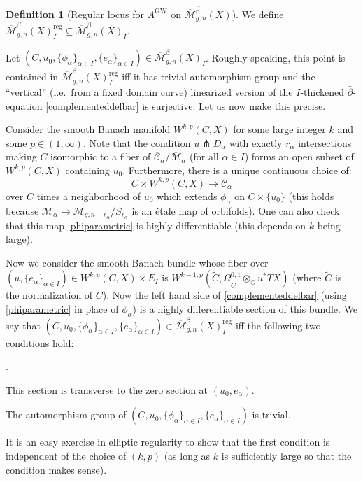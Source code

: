 \documentclass[12pt]{article}
\theoremstyle{definition}
\newtheorem{definition}[theorem]{Definition}
\theoremstyle{remark}
\numberwithin{equation}{subsection}
\newcommand{\CC}{\mathbb C}
\newcommand{\Mbar}{\overline{\mathcal M}}
\newcommand{\Cbar}{\overline{\mathcal C}}
\newcommand{\delbar}{\bar\partial}
\newcommand{\GW}{\mathrm{GW}}
\newcommand{\reg}{\mathrm{reg}}
\newcounter{rcounti}
\newenvironment{rlist}{\begin{list}{\roman{rcounti}.}{\usecounter{rcounti}
\setlength\itemsep{0pt}
\setlength\labelsep{4pt}
\setlength\labelwidth{16pt}
\setlength\leftmargin{32pt}
\setlength\listparindent{0pt}
\setlength\parsep{0pt}
\setlength\parskip{0pt}
\setlength\partopsep{0pt}
\setlength\rightmargin{0pt}
\setlength\topsep{0pt}
\setlength\itemindent{0pt}
}}{\end{list}}
\begin{document}
\begin{definition}[Regular locus for $A^\GW$ on $\Mbar_{g,n}^\beta(X)$]\label{regularsubsetdefinition}
We define $\Mbar_{g,n}^\beta(X)_I^\reg\subseteq\Mbar_{g,n}^\beta(X)_I$.

Let $(C,u_0,\{\phi_\alpha\}_{\alpha\in I},\{e_\alpha\}_{\alpha\in I})\in\Mbar_{g,n}^\beta(X)_I$.  Roughly speaking, this point is contained in $\Mbar_{g,n}^\beta(X)_I^\reg$ iff it has trivial automorphism group and the ``vertical'' (i.e.\ from a fixed domain curve) linearized version of the $I$-thickened $\delbar$-equation \eqref{complementeddelbar} is surjective.  Let us now make this precise.

Consider the smooth Banach manifold $W^{k,p}(C,X)$ for some large integer $k$ and some $p\in(1,\infty)$.  Note that the condition $u\pitchfork D_\alpha$ with exactly $r_\alpha$ intersections making $C$ isomorphic to a fiber of $\Cbar_\alpha/\Mbar_\alpha$ (for all $\alpha\in I$) forms an open subset of $W^{k,p}(C,X)$ containing $u_0$.  Furthermore, there is a unique continuous choice of:
\begin{equation}\label{phiparametric}
C\times W^{k,p}(C,X)\to\Cbar_\alpha
\end{equation}
over $C$ times a neighborhood of $u_0$ which extends $\phi_\alpha$ on $C\times\{u_0\}$ (this holds because $\Mbar_\alpha\to\Mbar_{g,n+r_\alpha}/S_{r_\alpha}$ is an \'etale map of orbifolds).  One can also check that this map \eqref{phiparametric} is highly differentiable (this depends on $k$ being large).

Now we consider the smooth Banach bundle whose fiber over $(u,\{e_\alpha\}_{\alpha\in I})\in W^{k,p}(C,X)\times E_I$ is $W^{k-1,p}(\tilde C,\Omega^{0,1}_{\tilde C}\otimes_\CC u^\ast TX)$ (where $\tilde C$ is the normalization of $C$).  Now the left hand side of \eqref{complementeddelbar} (using \eqref{phiparametric} in place of $\phi_\alpha$) is a highly differentiable section of this bundle.  We say that $(C,u_0,\{\phi_\alpha\}_{\alpha\in I},\{e_\alpha\}_{\alpha\in I})\in\Mbar_{g,n}^\beta(X)_I^\reg$ iff the following two conditions hold:
\begin{rlist}
\item This section is transverse to the zero section at $(u_0,e_\alpha)$.
\item The automorphism group of $(C,u_0,\{\phi_\alpha\}_{\alpha\in I},\{e_\alpha\}_{\alpha\in I})$ is trivial.
\end{rlist}
It is an easy exercise in elliptic regularity to show that the first condition is independent of the choice of $(k,p)$ (as long as $k$ is sufficiently large so that the condition makes sense).
\end{definition}
\end{document}
